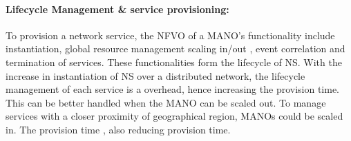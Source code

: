 \paragraph{Lifecycle Management \& service provisioning:} To provision a network service, the NFVO of a MANO's functionality include instantiation, global resource management scaling in/out , event correlation and termination of services. These functionalities form the lifecycle of NS. With the increase in instantiation of NS over a distributed network, the lifecycle management of each service is a overhead, hence increasing the provision time. This can be better handled when the MANO can be scaled out. To manage services with a closer proximity of geographical region, MANOs could be scaled in. The provision time , also reducing provision time.



